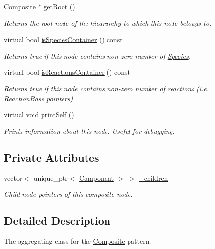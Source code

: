 \begin{DoxyCompactItemize}
\hyperlink{classComposite}{Composite} $\ast$ \hyperlink{classComponent_abcb3746cb8b4afcecf437dce40c0c772}{get\+Root} ()
\begin{DoxyCompactList}\small\item\em Returns the root node of the hieararchy to which this node belongs to. \end{DoxyCompactList}\item 
virtual bool \hyperlink{classComponent_a0daf865ff32aff9e68316c65b681cbf9}{is\+Species\+Container} () const 
\begin{DoxyCompactList}\small\item\em Returns true if this node contains non-\/zero number of \hyperlink{classSpecies}{Species}. \end{DoxyCompactList}\item 
virtual bool \hyperlink{classComponent_a506e080028078ef9a753d854c60904a3}{is\+Reactions\+Container} () const 
\begin{DoxyCompactList}\small\item\em Returns true if this node contains non-\/zero number of reactions (i.\+e. \hyperlink{classReactionBase}{Reaction\+Base} pointers) \end{DoxyCompactList}\item 
virtual void \hyperlink{classComponent_a871fbdc783ea600ed667dd37eb8adf1e}{print\+Self} ()
\begin{DoxyCompactList}\small\item\em Prints information about this node. Useful for debugging. \end{DoxyCompactList}\end{DoxyCompactItemize}
\subsection*{Private Attributes}
\begin{DoxyCompactItemize}
\item 
vector$<$ unique\+\_\+ptr$<$ \hyperlink{classComponent}{Component} $>$ $>$ \hyperlink{classComposite_a46a76879df0f619b5b4d4861d4079789}{\+\_\+children}
\begin{DoxyCompactList}\small\item\em Child node pointers of this composite node. \end{DoxyCompactList}\end{DoxyCompactItemize}


\subsection{Detailed Description}
The aggregating class for the \hyperlink{classComposite}{Composite} pattern. 

